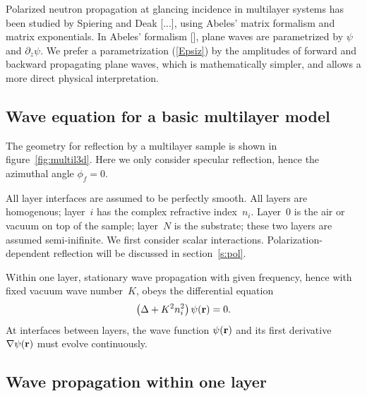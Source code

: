 Polarized neutron propagation at glancing incidence
in multilayer systems has been studied by Spiering and Deak [...],
using Abeles' matrix formalism and matrix exponentials.
In Abeles' formalism [],
plane waves are parametrized by $\psi$ and $\partial_z\psi$.
We prefer a parametrization (\ref{Epsiz})
by the amplitudes of forward and backward propagating plane waves,
which is mathematically simpler,
and allows a more direct physical interpretation.

\subsection{Wave equation for a basic multilayer model}

The geometry for reflection by a multilayer sample is shown in figure~\ref{fig:multil3d}. Here we only consider specular reflection, hence the azimuthal angle $\phi_f = 0$.

All layer interfaces are assumed to be perfectly smooth.
All layers are homogenous; layer~$i$ has the complex refractive index~$n_i$.
Layer~0 is the air or vacuum on top of the sample;
layer~$N$ is the substrate; these two layers are assumed semi-inifinite.
We first consider scalar interactions.
Polarization-dependent reflection
will be discussed in section~\ref{s:pol}. 

Within one layer,
stationary wave propagation with given frequency,
hence with fixed vacuum wave number~$K$,
obeys the differential equation
\begin{equation}\label{Escalar_wave}
\left(\Delta + K^2 n_i^2 \right) \psi(\mathbf{r}) = 0.
\end{equation}
At interfaces between layers,
the wave function $\psi(\mathbf{r})$ and its first derivative
$\mathbf{\nabla}\psi(\mathbf{r})$ must evolve continuously.


\subsection{Wave propagation within one layer}

